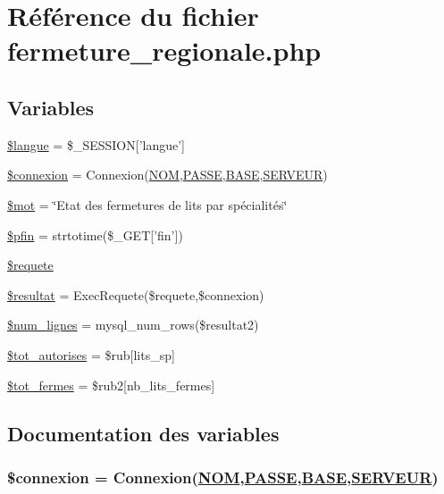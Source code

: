 \hypertarget{fermeture__regionale_8php}{
\section{R\'{e}f\'{e}rence du fichier fermeture\_\-regionale.php}
\label{fermeture__regionale_8php}
}
\subsection*{Variables}
\begin{CompactItemize}
\item 
\hyperlink{fermeture__regionale_8php_a0}{\$langue} = \$\_\-SESSION\mbox{[}'langue'\mbox{]}
\item 
\hyperlink{fermeture__regionale_8php_a1}{\$connexion} = Connexion(\hyperlink{pma__connect_8php_a0}{NOM},\hyperlink{pma__connect_8php_a1}{PASSE},\hyperlink{pma__connect_8php_a3}{BASE},\hyperlink{pma__connect_8php_a2}{SERVEUR})
\item 
\hyperlink{fermeture__regionale_8php_a2}{\$mot} = \char`\"{}Etat des fermetures de lits par sp\'{e}cialit\'{e}s\char`\"{}
\item 
\hyperlink{fermeture__regionale_8php_a3}{\$pfin} = strtotime(\$\_\-GET\mbox{[}'fin'\mbox{]})
\item 
\hyperlink{fermeture__regionale_8php_a4}{\$requete}
\item 
\hyperlink{fermeture__regionale_8php_a5}{\$resultat} = Exec\-Requete(\$requete,\$connexion)
\item 
\hyperlink{fermeture__regionale_8php_a6}{\$num\_\-lignes} = mysql\_\-num\_\-rows(\$resultat2)
\item 
\hyperlink{fermeture__regionale_8php_a7}{\$tot\_\-autorises} = \$rub\mbox{[}lits\_\-sp\mbox{]}
\item 
\hyperlink{fermeture__regionale_8php_a8}{\$tot\_\-fermes} = \$rub2\mbox{[}nb\_\-lits\_\-fermes\mbox{]}
\end{CompactItemize}


\subsection{Documentation des variables}
\hypertarget{fermeture__regionale_8php_a1}{
\subsubsection[\$connexion]{\setlength{\rightskip}{0pt plus 5cm}\$connexion = Connexion(\hyperlink{pma__connect_8php_a0}{NOM},\hyperlink{pma__connect_8php_a1}{PASSE},\hyperlink{pma__connect_8php_a3}{BASE},\hyperlink{pma__connect_8php_a2}{SERVEUR})}}
\label{fermeture__regionale_8php_a1}


